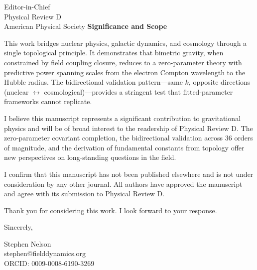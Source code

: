 \documentclass[11pt]{letter}
\begin{document}
\begin{letter}{%
Editor-in-Chief\\
Physical Review D\\
American Physical Society
}
\textbf{Significance and Scope}

This work bridges nuclear physics, galactic dynamics, and cosmology through a single topological principle. It demonstrates that bimetric gravity, when constrained by field coupling closure, reduces to a zero-parameter theory with predictive power spanning scales from the electron Compton wavelength to the Hubble radius. The bidirectional validation pattern—same $k$, opposite directions (nuclear $\leftrightarrow$ cosmological)—provides a stringent test that fitted-parameter frameworks cannot replicate.

I believe this manuscript represents a significant contribution to gravitational physics and will be of broad interest to the readership of Physical Review D. The zero-parameter covariant completion, the bidirectional validation across 36 orders of magnitude, and the derivation of fundamental constants from topology offer new perspectives on long-standing questions in the field.

I confirm that this manuscript has not been published elsewhere and is not under consideration by any other journal. All authors have approved the manuscript and agree with its submission to Physical Review D.

Thank you for considering this work. I look forward to your response.

\noindent
Sincerely,

\vspace{2\medskipamount}

\noindent
Stephen Nelson\\
stephen@fielddynamics.org\\
ORCID: 0009-0008-6190-3269

\end{letter}
\end{document}
